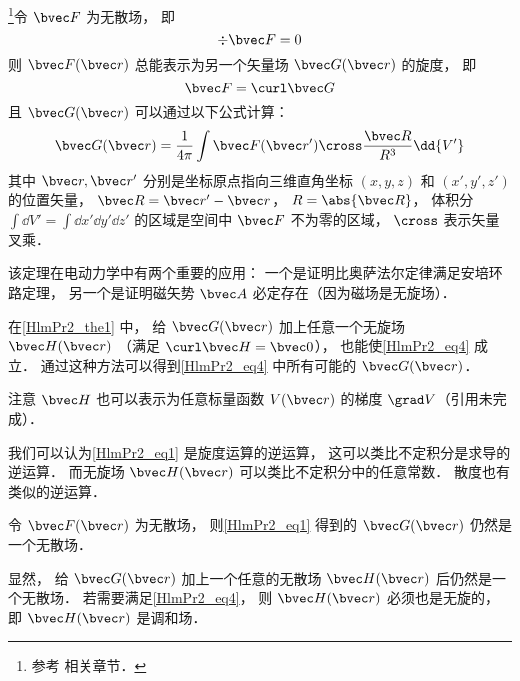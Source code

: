 
\begin{issues}
\issueTODO
\end{issues}


\begin{theorem}{}\label{HlmPr2_the1}
\footnote{参考 \cite{GriffE} 相关章节．}令 $\bvec F$ 为无散场， 即
\begin{equation}
\div \bvec F = 0
\end{equation}
则 $\bvec F(\bvec r)$ 总能表示为另一个矢量场 $\bvec G(\bvec r)$ 的旋度， 即
\begin{equation}\label{HlmPr2_eq4}
\bvec F = \curl \bvec G
\end{equation}
且 $\bvec G(\bvec r)$ 可以通过以下公式计算：
\begin{equation}\label{HlmPr2_eq1}
\bvec G(\bvec r) = \frac{1}{4\pi}\int \bvec F(\bvec r') \cross \frac{\bvec R}{R^3} \dd{V'}
\end{equation}
其中 $\bvec r, \bvec r'$ 分别是坐标原点指向三维直角坐标 $(x, y, z)$ 和 $(x', y', z')$ 的位置矢量， $\bvec R = \bvec r' - \bvec r$， $R = \abs{\bvec R}$， 体积分 $\int\dd{V'} = \int\dd{x'}\dd{y'}\dd{z'}$ 的区域是空间中 $\bvec F$ 不为零的区域， $\cross$ 表示矢量叉乘．
\end{theorem}

该定理在电动力学中有两个重要的应用： 一个是证明比奥萨法尔定律满足安培环路定理， 另一个是证明磁矢势 $\bvec A$ 必定存在（因为磁场是无旋场）．

\begin{corollary}{}\label{HlmPr2_cor1}
在\autoref{HlmPr2_the1} 中， 给 $\bvec G(\bvec r)$ 加上任意一个无旋场 $\bvec H(\bvec r)$ （满足 $\curl \bvec H = \bvec 0$）， 也能使\autoref{HlmPr2_eq4} 成立． 通过这种方法可以得到\autoref{HlmPr2_eq4} 中所有可能的 $\bvec G(\bvec r)$．
\end{corollary}
注意 $\bvec H$ 也可以表示为任意标量函数 $V(\bvec r)$ 的梯度 $\grad V$（引用未完成）．

我们可以认为\autoref{HlmPr2_eq1} 是旋度运算的逆运算， 这可以类比不定积分是求导的逆运算． 而无旋场 $\bvec H(\bvec r)$ 可以类比不定积分中的任意常数． 散度也有类似的逆运算．

\begin{theorem}{}\label{HlmPr2_the2}
令 $\bvec F(\bvec r)$ 为无散场， 则\autoref{HlmPr2_eq1} 得到的 $\bvec G(\bvec r)$ 仍然是一个无散场．
\end{theorem}
显然， 给 $\bvec G(\bvec r)$ 加上一个任意的无散场 $\bvec H(\bvec r)$ 后仍然是一个无散场． 若需要满足\autoref{HlmPr2_eq4}， 则 $\bvec H(\bvec r)$ 必须也是无旋的， 即 $\bvec H(\bvec r)$ 是调和场．

